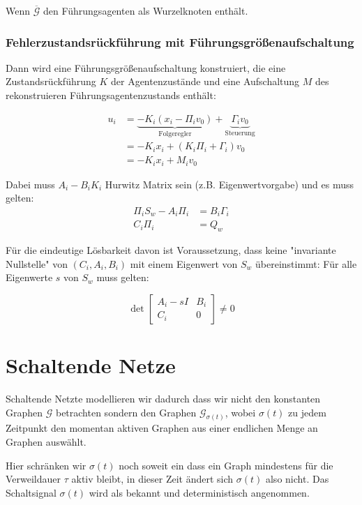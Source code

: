 Wenn $\overbar{\mathcal{G}}$ den Führungsagenten als Wurzelknoten enthält.

\subsubsection{Fehlerzustandsrückführung mit Führungsgrößenaufschaltung}
\label{sec:heterogen_regler}

Dann wird eine Führungsgrößenaufschaltung konstruiert, die eine Zustandsrückführung $K$
der Agentenzustände und eine Aufschaltung $M$ des rekonstruieren
Führungsagentenzustands enthält:

\begin{align}
    u_i &= \underbrace{-K_i (x_i - \Pi_i v_0)}_\text{Folgeregler}
    + \underbrace{\Gamma_i v_0}_\text{Steuerung} \\
    &= -K_i x_i + (K_i \Pi_i + \Gamma_i) v_0 \\
    &= -K_i x_i + M_i v_0
\end{align}

Dabei muss $A_i - B_i K_i$ Hurwitz Matrix sein (z.B. Eigenwertvorgabe) und es muss
gelten:
\begin{align}
    \Pi_i S_w - A_i \Pi_i &= B_i \Gamma_i \\
    C_i \Pi_i &= Q_w
\end{align}

Für die eindeutige Lösbarkeit davon ist Voraussetzung, dass keine "invariante Nullstelle"
von $(C_i, A_i, B_i)$ mit einem Eigenwert von $S_w$ übereinstimmt:
Für alle Eigenwerte $s$ von $S_w$ muss gelten:

\begin{equation}
    \det \begin{bmatrix}
        A_i -sI & B_i \\
        C_i & 0
    \end{bmatrix}
    \neq 0
\end{equation}

\pagebreak
\section{Schaltende Netze}

Schaltende Netzte modellieren wir dadurch dass wir nicht den konstanten
Graphen $\mathcal{G}$ betrachten sondern den Graphen $\mathcal{G}_{\sigma(t)}$,
wobei $\sigma(t)$ zu jedem Zeitpunkt den momentan aktiven Graphen
aus einer endlichen Menge an Graphen auswählt.

Hier schränken wir $\sigma(t)$ noch soweit ein dass ein Graph mindestens
für die Verweildauer $\tau$ aktiv bleibt, in dieser Zeit ändert sich
$\sigma(t)$ also nicht.
Das Schaltsignal $\sigma(t)$ wird als bekannt und deterministisch 
angenommen.

